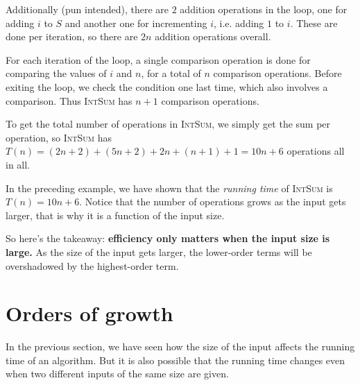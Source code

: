\begin{example}
Additionally (pun intended), there are $2$ addition operations in the loop, one for adding $i$ to $S$ and another one for incrementing $i$, i.e. adding $1$ to $i$. These are done per iteration, so there are $2n$ addition operations overall.

For each iteration of the loop, a single comparison operation is done for comparing the values of $i$ and $n$, for a total of $n$ comparison operations. Before exiting the loop, we check the condition one last time, which also involves a comparison. Thus \textsc{IntSum} has $n+1$ comparison operations.

To get the total number of operations in \textsc{IntSum}, we simply get the sum per operation, so \textsc{IntSum} has $T\left(n\right) = \left(2n+2\right) + \left(5n+2\right) + 2n + \left(n+1\right) + 1 = \boxed{10n+6}$ operations all in all.
\end{example}

In the preceding example, we have shown that the \textit{running time} of \textsc{IntSum} is $T\left(n\right) = 10n+6$. Notice that the number of operations grows as the input gets larger, that is why it is a function of the input size.

So here's the takeaway: \textbf{efficiency only matters when the input size is large.} As the size of the input gets larger, the lower-order terms will be overshadowed by the highest-order term.

\section{Orders of growth}

In the previous section, we have seen how the size of the input affects the running time of an algorithm. But it is also possible that the running time changes even when two different inputs of the same size are given.

